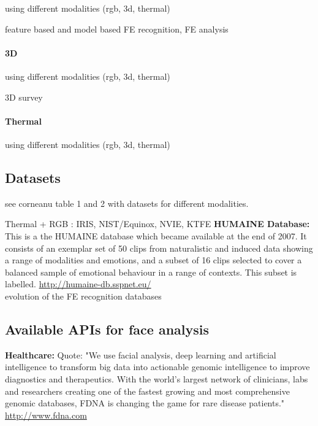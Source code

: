 using different modalities (rgb, 3d, thermal)\cite{Corneanu2016survey}

feature based and model based FE recognition\cite{Mishra2015}, FE analysis \cite{Tian2005}

\paragraph{3D}
using different modalities (rgb, 3d, thermal)\cite{Corneanu2016survey}

3D \cite{Danelakis2015}survey\cite{Sandbach2012survey}
\paragraph{Thermal}
using different modalities (rgb, 3d, thermal)\cite{Corneanu2016survey}







\subsection{Datasets}

see corneanu table 1 and 2 with datasets for different modalities.


Thermal + RGB : IRIS, NIST/Equinox, NVIE, KTFE
\textbf{HUMAINE Database:} 
This is a the HUMAINE database which became available at the end of 2007. It consists of an exemplar set of 50 clips from naturalistic and induced data showing a range of modalities and emotions, and a subset of 16 clips selected to cover a balanced sample of emotional behaviour in a range of contexts. This subset is labelled. \url{http://humaine-db.sspnet.eu/}\\


evolution of the FE recognition databases \cite{Roychowdhury2015survey}\\


\subsection{Available APIs for face analysis}

\textbf{Healthcare:} 
Quote: "We use facial analysis, deep learning and artificial intelligence to transform big data into actionable genomic intelligence to improve diagnostics and therapeutics. With the world’s largest network of clinicians, labs and researchers creating one of the fastest growing and most comprehensive genomic databases, FDNA is changing the game for rare disease patients."
\url{http://www.fdna.com}\\


